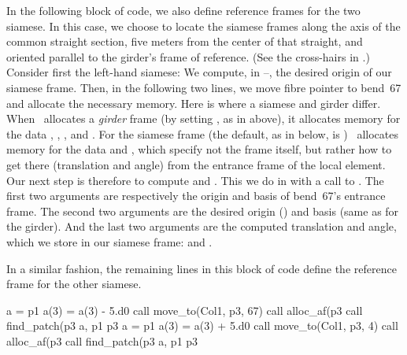 %
In the following block of code, we also define reference frames for
the two siamese. In this case, we choose to locate the siamese frames
along the axis of the common straight section, five meters from the
center of that straight, and oriented parallel to the girder's frame of
reference. (See the cross-hairs in .) Consider first
the left-hand siamese: We compute, in --,
the desired origin of our siamese frame. Then, in the following two
lines, we move fibre pointer  to bend~67 and allocate the
necessary memory.%
Here is where a siamese and girder differ. When \PTC\ allocates a
\emph{girder} frame (by setting , as in
 above), it allocates memory for the data ,
, , and . For the siamese frame (the default, as in
 below,  is ) \PTC\ allocates
memory for the data  and , which specify not the
frame itself, but rather how to get there (translation and angle)
from the entrance frame of the local element. Our next step is
therefore to compute  and . This we do in
 with a call to . The first two
arguments are respectively the origin and basis of bend~67's entrance
frame. The second two arguments are the desired origin () and
basis (same as for the girder). And the last two arguments are
the computed translation and angle, which we store in our siamese
frame:  and
.

In a similar fashion, the remaining lines in this block of code
define the reference frame for the other siamese.
%
\begin{ptccode}
a = p1%
a(3) = a(3) - 5.d0                                \label{lin:sf.eorg}
call move_to(Col1, p3, 67)
call alloc_af(p3%
call find_patch(p3%
                a, p1%
                p3%
a = p1%
a(3) = a(3) + 5.d0
call move_to(Col1, p3, 4)
call alloc_af(p3%
call find_patch(p3%
                a, p1%
                p3%
\end{ptccode}


